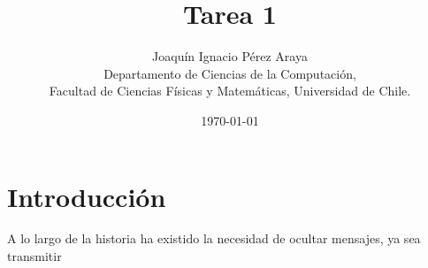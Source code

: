 \documentclass{article}
\begin{document}
\title{Tarea 1 }
\author{Joaquín Ignacio Pérez Araya\footnotemark \\ Departamento de Ciencias de la Computación, \\ Facultad de Ciencias Físicas y Matemáticas, Universidad de Chile.}
\date{\today}


\maketitle

\begin{abstract}

\end{abstract}

\section*{Introducción} %
    A lo largo de la historia ha existido la necesidad de ocultar mensajes, ya sea transmitir 

\begin{thebibliography}{99}


\end{thebibliography}
\end{document}
